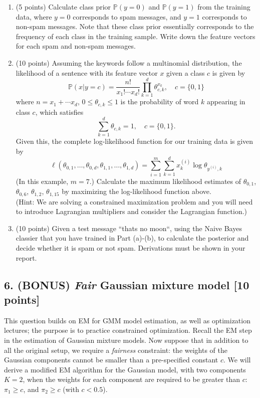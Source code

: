 \documentclass[12pt]{article}
\begin{document}
\begin{enumerate}
\item (5 points) Calculate class prior $\mathbb P(y = 0)$ and $\mathbb P(y = 1)$ from the training data, where $y = 0$ corresponds to spam messages, and $y = 1$ corresponds to non-spam messages. Note that these class prior essentially corresponds to the frequency of each class in the training sample. Write down the feature vectors for each spam and non-spam messages.



\item (10 points)  Assuming the keywords follow a multinomial distribution, the likelihood of a sentence with its feature vector $x$ given a class $c$ is given by 
\[
 \mathbb P (x|y = c) = \frac{n!}{x_1! \cdots x_d!}\prod_{k=1}^d \theta_{c, k}^{x_k}, \quad c = \{0, 1\}
\]
where $n = x_1 + \cdots x_d$, $0 \leq \theta_{c,k} \leq 1$ is the probability of word $k$ appearing in class $c$, which satisfies 
\[\sum_{k=1}^d \theta_{c,k} = 1, \quad c = \{0, 1\}.\] Given this, the complete log-likelihood function for our training data is given by
\[
\ell(\theta_{0,1}, \ldots, \theta_{0, d}, \theta_{1,1}, \ldots, \theta_{1, d}) = 
\sum_{i=1}^m \sum_{k=1}^d x_k^{(i)} \log \theta_{y^{(i)}, k}
\]
(In this example, $m = 7$.)
 Calculate the maximum likelihood estimates of $\theta_{0,1}$, $\theta_{0,6}$, $\theta_{1,2}$, $\theta_{1,15}$ by maximizing the log-likelihood function above.\\
 (Hint: We are solving a constrained maximization problem and you will need to introduce Lagrangian multipliers and consider the Lagrangian function.)

 
\item (10 points) Given a test message ``\textsf{thats no moon}``, using the Naive Bayes classier that you have trained in Part (a)-(b), to calculate the posterior and decide whether it is spam or not spam. Derivations must be shown in your report.



\end{enumerate}

\pagebreak

\subsection*{6. (BONUS) {\it Fair} Gaussian mixture model  [10 points]}

This question builds on EM for GMM model estimation, as well as optimization lectures; the purpose is to practice constrained optimization. 
Recall the EM step in the estimation of Gaussian mixture models. Now suppose that in addition to all the original setup, we require a {\it fairness} constraint: the weights of the Gaussian components cannot be smaller than a pre-specified constant $c$. We will derive a modified EM algorithm for the Gaussian model, with two components $K = 2$, when the weights for each component are required to be greater than $c$: $\pi_1 \geq c$, and $\pi_2 \geq c$ (with $c<0.5$). \\
\end{document}
